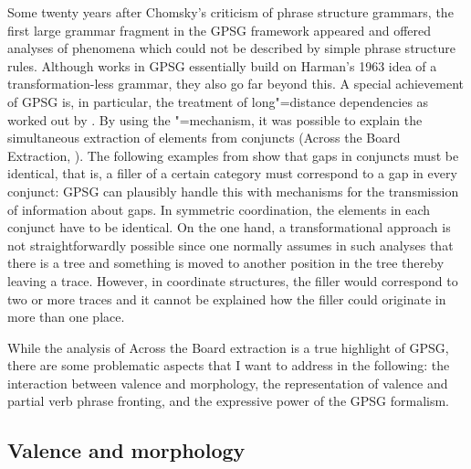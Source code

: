 Some
twenty years after Chomsky's criticism of phrase structure grammars, the first large grammar fragment in the GPSG framework appeared and offered analyses of phenomena
which could not be described by simple phrase structure rules. Although works in GPSG essentially build on Harman's 1963 idea of a transformation-less grammar, they also go far
beyond this. A special achievement of GPSG is, in particular, the treatment of long"=distance dependencies as worked out by \citet{Gazdar81a}. By using the \slasch"=mechanism, it
was possible to explain the simultaneous extraction of elements from conjuncts (Across the Board Extraction, \citealp{Ross67a}). The following examples from
\citet[]{Gazdar81a} show that gaps in conjuncts must be identical, that is, a filler of a certain category must correspond to a gap in every conjunct:
\eal\settowidth{}
\label{ex-atb-gazdar}
\zl
GPSG can plausibly handle this with mechanisms for the transmission of information about gaps. In symmetric coordination, the \slasch elements in each conjunct have
to be identical. On the one hand,
a transformational approach is not straightforwardly possible since
one normally assumes in such analyses that there is a tree and something is moved to another
position in the tree thereby leaving a trace. However, in coordinate structures, the filler would
correspond to two or more traces and it cannot be explained how the filler could originate in more
than one place.

While the analysis of Across the Board extraction is a true highlight of GPSG, there are some problematic
aspects that I want to address in the following: the interaction between valence and morphology,
the representation of valence and partial verb phrase fronting, and the expressive power of the GPSG
formalism. 

\subsection{Valence and morphology}

